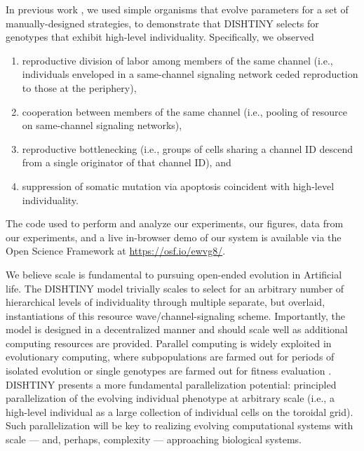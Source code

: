 In previous work \cite{moreno2018toward}, we used simple organisms that evolve parameters for a set of manually-designed strategies, to demonstrate that DISHTINY selects for genotypes that exhibit high-level individuality.
Specifically, we observed
\begin{enumerate}
  \item reproductive division of labor among members of the same channel (i.e., individuals enveloped in a same-channel signaling network ceded reproduction to those at the periphery),
  \item cooperation between members of the same channel (i.e., pooling of resource on same-channel signaling networks),
  \item reproductive bottlenecking (i.e., groups of cells sharing a channel ID descend from a single originator of that channel ID), and
  \item suppression of somatic mutation via apoptosis coincident with high-level individuality.
\end{enumerate}

The code used to perform and analyze our experiments, our figures, data from our experiments, and a live in-browser demo of our system is available via the Open Science Framework at \url{https://osf.io/ewvg8/}.

We believe scale is fundamental to pursuing open-ended evolution in Artificial life.
The DISHTINY model trivially scales to select for an arbitrary number of hierarchical levels of individuality through multiple separate, but overlaid, instantiations of this resource wave/channel-signaling scheme.
Importantly, the model is designed in a decentralized manner and should scale well as additional computing resources are provided.
Parallel computing is widely exploited in evolutionary computing, where subpopulations are farmed out for periods of isolated evolution or single genotypes are farmed out for fitness evaluation
\cite{lin1994coarse, real17a}.
DISHTINY presents a more fundamental parallelization potential: principled parallelization of the evolving individual phenotype at arbitrary scale (i.e., a high-level individual as a large collection of individual cells on the toroidal grid).
Such parallelization will be key to realizing evolving computational systems with scale --- and, perhaps, complexity --- approaching biological systems.
